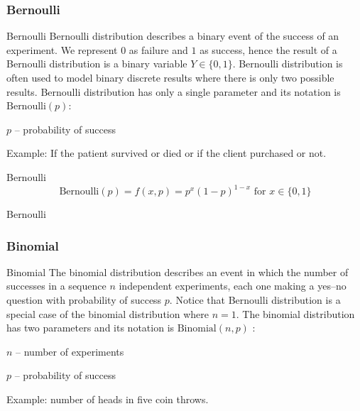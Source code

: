 \subsubsection*{Bernoulli}
\begin{frame}[noframenumbering]{Bernoulli}
	Bernoulli distribution describes a binary event of the success of an experiment.
	We represent $0$ as failure and $1$ as success, hence the result of a
	Bernoulli distribution is a binary variable $Y \in \{0, 1\}$.
	\vfill
	Bernoulli distribution is often used to model binary discrete results
	where there is only two possible results.
	\vfill
	Bernoulli distribution has only a single parameter and its notation is
	$\text{Bernoulli} (p)$:
	\begin{vfilleditems}
		\item $p$ -- probability of success
	\end{vfilleditems}
	\vfill
	Example: If the patient survived or died or if the client purchased or not.
\end{frame}

\begin{frame}[noframenumbering]{Bernoulli}
	$$\text{Bernoulli}(p) = f(x, p)=p^{x}(1-p)^{1-x} \text{ for $x \in \{0,1\}$}$$ %
\end{frame}

\begin{frame}[noframenumbering]{Bernoulli}
	\centering
\end{frame}

\subsubsection*{Binomial}
\begin{frame}[noframenumbering]{Binomial}
	The binomial distribution describes an event in which the number of
	successes in a sequence $n$ independent experiments,
	each one making a yes--no question with probability of success $p$.
	Notice that Bernoulli distribution is a special case of the binomial
	distribution where $n=1$.
	\vfill
	The binomial distribution has two parameters and its notation is
	$\text{Binomial}(n, p)$ :
	\begin{vfilleditems}
		\item $n$ -- number of experiments
		\item $p$ -- probability of success
	\end{vfilleditems}
	\vfill
	Example: number of heads in five coin throws.
\end{frame}

